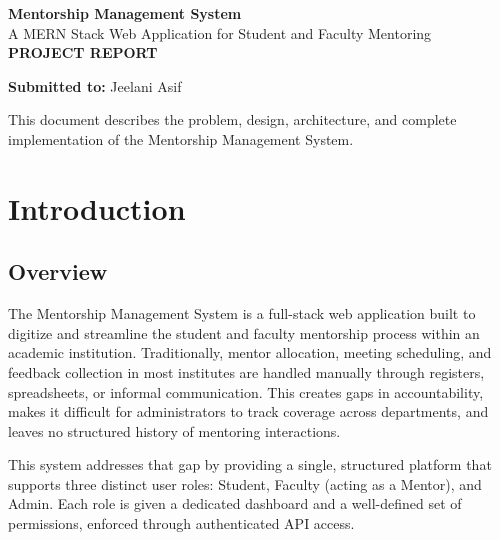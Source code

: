\documentclass[12pt,a4paper]{report}
\newcommand{\sectionrule}{\vspace{-4pt}{\color{lightgray}\hrule height 1pt}\vspace{8pt}}
\begin{document}
\begin{titlepage}
\centering
\vspace*{2cm}

{\Huge\bfseries\color{primary} Mentorship Management System}\\[6pt]
{\Large\color{accent} A MERN Stack Web Application for Student and Faculty Mentoring}\\[1.4cm]

{\large\bfseries PROJECT REPORT}\\[2.2cm]


\vspace{2.2cm}

{\large \textbf{Submitted to:} Jeelani Asif}

\vfill

{\small\color{gray} This document describes the problem, design, architecture, and complete implementation of the Mentorship Management System.}

\end{titlepage}

\tableofcontents
\clearpage

\chapter{Introduction}

\section{Overview}
\sectionrule
The Mentorship Management System is a full-stack web application built to digitize and streamline the student and faculty mentorship process within an academic institution. Traditionally, mentor allocation, meeting scheduling, and feedback collection in most institutes are handled manually through registers, spreadsheets, or informal communication. This creates gaps in accountability, makes it difficult for administrators to track coverage across departments, and leaves no structured history of mentoring interactions.

This system addresses that gap by providing a single, structured platform that supports three distinct user roles: Student, Faculty (acting as a Mentor), and Admin. Each role is given a dedicated dashboard and a well-defined set of permissions, enforced through authenticated API access.
\end{document}
